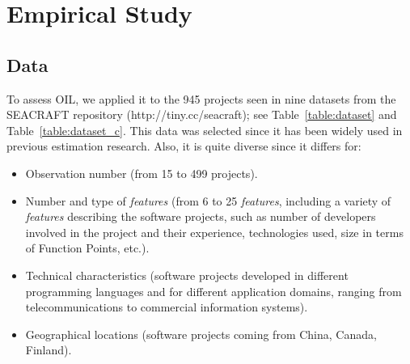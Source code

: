 \documentclass[10pt,conference]{IEEEtran}
\newcommand{\bi}{\begin{itemize}}
\newcommand{\ei}{\end{itemize}}
\begin{document}
 
 
\section{Empirical Study} \label{sect:study} 

\subsection{Data}

To assess OIL, we applied it to the 945 projects
seen in nine    datasets from the SEACRAFT repository (http://tiny.cc/seacraft); see Table~\ref{table:dataset} and Table~\ref{table:dataset_c}. 
This data was selected since it has been  widely  used in previous estimation research.
Also, it  is quite diverse since it differs for:
\bi
\item
Observation number (from 15 to 499 projects). 
\item
Number and type of {\em features} (from 6 to 25 {\em features}, including a variety of {\em features} describing the software projects, such as number of developers involved in the project and their experience, technologies used, size in terms of Function Points, etc.).
\item
Technical characteristics (software projects developed in different programming languages and for different application domains, ranging from telecommunications to commercial information systems).
\item
Geographical locations (software projects coming from China, Canada, Finland). 
\ei
\end{document}
